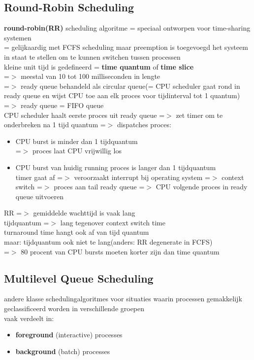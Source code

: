 \documentclass{report}
\begin{document}
\subsection{Round-Robin Scheduling}
\textbf{round-robin(RR)} scheduling algoritme = speciaal ontworpen voor time-sharing systemen
\\= gelijkaardig met FCFS scheduling maar preemption is toegevoegd het systeem in staat te stellen om te kunnen switchen tussen processen
\\kleine unit tijd is gedefineerd = \textbf{time quantum} of \textbf{time slice}
\\=$>$ meestal van 10 tot 100 milliseconden in lengte
\\=$>$ ready queue behandeld als circular queue(= CPU scheduler gaat rond in ready queue en wijst CPU toe aan elk proces voor tijdinterval tot 1 quantum)
\\=$>$ ready queue = FIFO queue
\\CPU scheduler haalt eerste proces uit ready queue =$>$ zet timer om te onderbreken na 1 tijd quantum =$>$ dispatches proces:
\begin{itemize}
\item CPU burst is minder dan 1 tijdquantum
\\=$>$ proces laat CPU vrijwillig los
\item CPU burst van huidig running proces is langer dan 1 tijdquantum
\\timer gaat af =$>$ veroorzaakt interrupt bij operating system =$>$ context switch =$>$ proces aan tail ready queue =$>$ CPU volgende proces in ready queue uitvoeren
\end{itemize}

RR =$>$ gemiddelde wachttijd is vaak lang
\\tijdquantum =$>$ lang tegenover context switch time
\\turnaround time hangt ook af van tijd quantum
\\maar: tijdquantum ook niet te lang(anders: RR degenerate in FCFS)
\\=$>$ 80 procent van CPU bursts moeten korter zijn dan time quantum

\subsection{Multilevel Queue Scheduling}
andere klasse schedulingalgoritmes voor situaties waarin processen gemakkelijk geclassificeerd worden in verschillende groepen
\\vaak verdeelt in:
\begin{itemize}
\item \textbf{foreground} (interactive) processes
\item \textbf{background} (batch) processes
\end{itemize}
\end{document}
